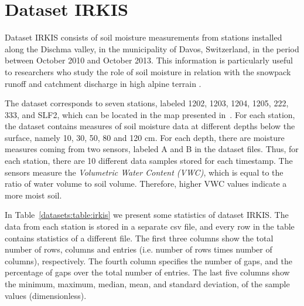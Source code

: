 
\clearpage
\section{Dataset IRKIS}
\label{datasets:irkis}


Dataset IRKIS \cite{dataset:irkis} consists of soil moisture measurements from stations installed along the Dischma valley, in the municipality of Davos, Switzerland, in the period between October 2010 and October 2013. This information is particularly useful to researchers who study the role of soil moisture in relation with the snowpack runoff and catchment discharge in high alpine terrain \cite{dataset:irkis2}. 


The dataset corresponds to seven stations, labeled 1202, 1203, 1204, 1205, 222, 333, and SLF2, which can be located in the map presented in~\cite{dataset:irkis}. For each station, the dataset contains measures of soil moisture data at different depths below the surface, namely 10, 30, 50, 80 and 120 cm. For each depth, there are moisture measures coming from two sensors, labeled A and B in the dataset files. Thus, for each station, there are 10 different data samples stored for each timestamp. The sensors measure the \textit{Volumetric Water Content (VWC)}, which is equal to the ratio of water volume to soil volume. Therefore, higher VWC values indicate a more moist soil. 


In Table~\ref{datasets:table:irkis} we present some statistics of dataset IRKIS. The data from each station is stored in a separate csv file, and every row in the table contains statistics of a different file. The first three columns show the total number of rows, columns and entries (i.e. number of rows times number of columns), respectively. The fourth column specifies the number of gaps, and the percentage of gaps over the total number of entries. The last five columns show the minimum, maximum, median, mean, and standard deviation, of the sample values (dimensionless).




